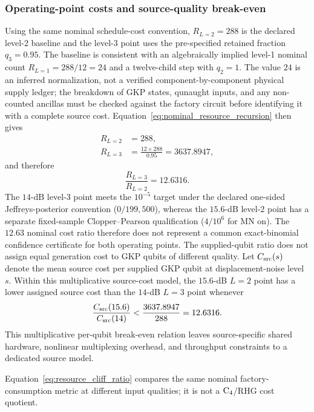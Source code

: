 \documentclass[aps,
prx,
superscriptaddress,
reprint,
longbibliography,
floatfix]{revtex4-2}
\begin{document}
\subsubsection{Operating-point costs and source-quality break-even}
Using the same nominal schedule-cost convention, $R_{L=2}=288$ is the declared level-2 baseline and the level-3 point uses the pre-specified retained fraction $q_3=0.95$. The baseline is consistent with an algebraically implied level-1 nominal count $R_{L=1}=288/12=24$ and a twelve-child step with $q_2=1$. The value $24$ is an inferred normalization, not a verified component-by-component physical supply ledger; the breakdown of GKP states, qunaught inputs, and any non-counted ancillas must be checked against the factory circuit before identifying it with a complete source cost. Equation~\eqref{eq:nominal_resource_recursion} then gives
\begin{align}
R_{L=2}&=288,\\
R_{L=3}&=\frac{12\times 288}{0.95}=3637.8947,
\end{align}
and therefore
\begin{equation}
\frac{R_{L=3}}{R_{L=2}}=12.6316.
\label{eq:resource_cliff_ratio}
\end{equation}
The $14$-dB level-3 point meets the $10^{-5}$ target under the declared one-sided Jeffreys-posterior convention ($0/199{,}500$), whereas the $15.6$-dB level-2 point has a separate fixed-sample Clopper--Pearson qualification ($4/10^6$ for MN on). The $12.63$ nominal cost ratio therefore does not represent a common exact-binomial confidence certificate for both operating points. The supplied-qubit ratio does not assign equal generation cost to GKP qubits of different quality. Let $C_{\rm src}(s)$ denote the mean source cost per supplied GKP qubit at displacement-noise level $s$. Within this multiplicative source-cost model, the $15.6$-dB $L=2$ point has a lower assigned source cost than the $14$-dB $L=3$ point whenever
\begin{equation}
\frac{C_{\rm src}(15.6)}{C_{\rm src}(14)}
<\frac{3637.8947}{288}=12.6316.
\label{eq:source_cost_break_even}
\end{equation}
This multiplicative per-qubit break-even relation leaves source-specific shared hardware, nonlinear multiplexing overhead, and throughput constraints to a dedicated source model.

Equation~\eqref{eq:resource_cliff_ratio} compares the same nominal factory-consumption metric at different input qualities; it is not a ${\rm C_4}$/RHG cost quotient.
\end{document}

